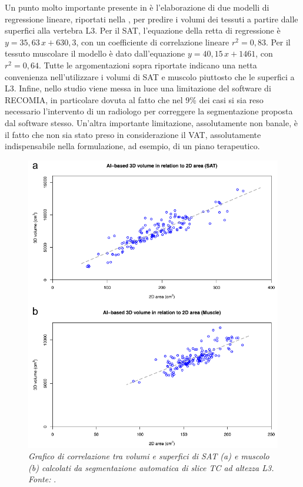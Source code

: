 Un punto molto importante presente in \cite{Borrelli2021} è l'elaborazione di due modelli di regressione lineare, riportati nella , per predire i volumi dei tessuti a partire dalle superfici alla vertebra L3. Per il SAT, l’equazione della retta di regressione è $ y = 35,63\,x + 630,3 $, con un coefficiente di correlazione lineare $ r^2 = 0,83 $. Per il tessuto muscolare il modello è dato dall'equazione $ y = 40,15\,x + 1461 $, con $ r^2 = 0,64 $. Tutte le argomentazioni sopra riportate indicano una netta convenienza nell'utilizzare i volumi di SAT e muscolo piuttosto che le superfici a L3. Infine, nello studio viene messa in luce una limitazione del software di RECOMIA, in particolare dovuta al fatto che nel 9\% dei casi si sia reso necessario l’intervento di un radiologo per correggere la segmentazione proposta dal software stesso. Un’altra importante limitazione, assolutamente non banale, è il fatto che non sia stato preso in considerazione il VAT, assolutamente indispensabile nella formulazione, ad esempio, di un piano terapeutico.
\begin{figure}[htp]
\centering
\includegraphics[scale=1]{Immagini/borrelli_regressione.png}
\caption{\label{fig:borrelli_regressione} \textit{Grafico di correlazione tra volumi e superfici di SAT (a) e muscolo (b) calcolati da segmentazione automatica di slice TC ad altezza L3. Fonte:} \cite{Borrelli2021}.}
\end{figure}

